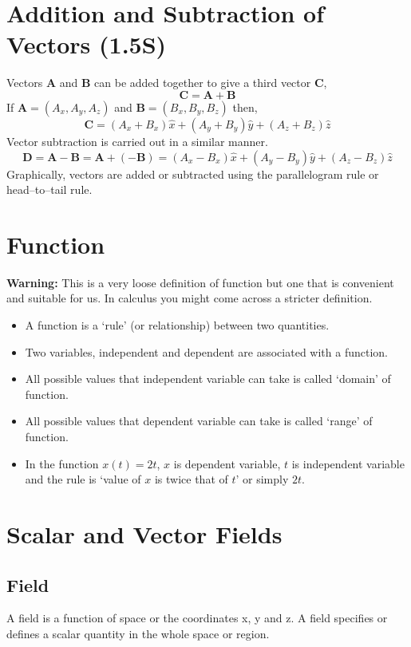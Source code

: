 \documentclass[12pt,a4paper]{article}
\begin{document}
\section{Addition and Subtraction of Vectors (1.5S)}
Vectors \textbf{A} and \textbf{B} can be added together to give a third vector \textbf{C},
\begin{equation}
\textbf{C}=\textbf{A}+\textbf{B}
\end{equation}
If $\textbf{A}=(A_x,A_y,A_z)$ and $\textbf{B}=(B_x,B_y,B_z)$ then,
\begin{equation}
\textbf{C}=(A_x+B_x)\hat x+(A_y+B_y)\hat y+(A_z+B_z)\hat z
\end{equation}
Vector subtraction is carried out in a similar manner.
\begin{equation}
\textbf{D}=\textbf{A}-\textbf{B}=\textbf{A}+(-\textbf{B})=(A_x-B_x)\hat x+(A_y-B_y)\hat y+(A_z-B_z)\hat z
\end{equation}
Graphically, vectors are added or subtracted using the parallelogram rule or head--to--tail rule.
\section{Function}
\noindent\textbf{Warning:} This is a very loose definition of function but one that is convenient and suitable for us. In calculus you might come across a stricter definition.
\begin{itemize}
\item A function is a `rule' (or relationship) between two quantities.
\item Two variables, independent and dependent are associated with a function.
\item All possible values that independent variable can take is called `domain' of function.
\item All possible values that dependent variable can take is called `range' of function.
\item In the function $x(t)=2t$, $x$ is dependent variable, $t$ is independent variable and the rule is `value of $x$ is twice that of $t$' or simply $2t$.
\end{itemize}
\section{Scalar and Vector Fields}
\subsection{Field}
A field is a function of space or the coordinates x, y and z. A field specifies or defines a scalar quantity in the whole space or region.
\end{document}
